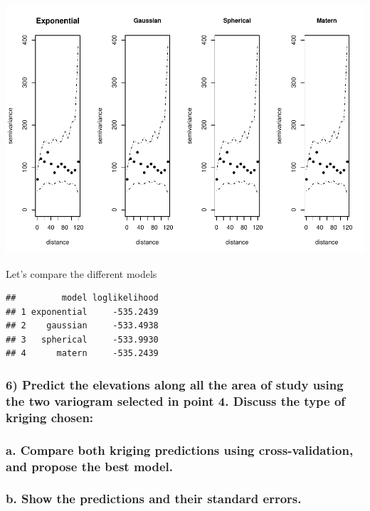 \documentclass[
]{article}
\begin{document}
\includegraphics{Assignment_1_files/figure-latex/unnamed-chunk-42-1.pdf}

Let's compare the different models

\begin{verbatim}
##         model loglikelihood
## 1 exponential     -535.2439
## 2    gaussian     -533.4938
## 3   spherical     -533.9930
## 4      matern     -535.2439
\end{verbatim}

\hypertarget{predict-the-elevations-along-all-the-area-of-study-using-the-two-variogram-selected-in-point-4.-discuss-the-type-of-kriging-chosen}{%
\subsubsection{6) Predict the elevations along all the area of study
using the two variogram selected in point 4. Discuss the type of kriging
chosen:}\label{predict-the-elevations-along-all-the-area-of-study-using-the-two-variogram-selected-in-point-4.-discuss-the-type-of-kriging-chosen}}

\hypertarget{a.-compare-both-kriging-predictions-using-cross-validation-and-propose-the-best-model.}{%
\subsubsection{a. Compare both kriging predictions using
cross-validation, and propose the best
model.}\label{a.-compare-both-kriging-predictions-using-cross-validation-and-propose-the-best-model.}}

\hypertarget{b.-show-the-predictions-and-their-standard-errors.}{%
\subsubsection{b. Show the predictions and their standard
errors.}\label{b.-show-the-predictions-and-their-standard-errors.}}
\end{document}
